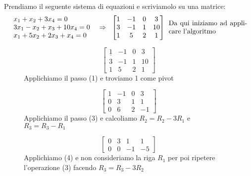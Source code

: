 \newpage
\begin{example}
Prendiamo il seguente sistema di equazioni e scriviamolo su una matrice:
\[
\begin{array}{l}
x_1 + x_2 + 3x_4 = 0\\
3x_1 - x_2 + x_3 + 10x_4 = 0\\
x_1 + 5x_2 + 2x_3 + x_4 = 0
\end{array}
\hspace{.2cm}
\Rightarrow
\hspace{.2cm}
\begin{bmatrix}
1 & -1 & 0 & 3\\
3 & -1 & 1 & 10\\
1 & 5 & 2 & 1
\end{bmatrix}
\:\:
\parbox{4cm}{Da qui iniziamo ad applicare l'algoritmo}
\]
\end{example}
\begin{figure}[h!]
    \vspace{-20pt}
    \centering
    \begin{minipage}{.3\linewidth}
        \centering
        \[
            \begin{bmatrix}
            \underline{1} & -1 & 0 & 3\\
            3 & -1 & 1 & 10\\
            1 & 5 & 2 & 1
            \end{bmatrix}
        \]
        Applichiamo il passo (1) e troviamo 1 come pivot
    \end{minipage}
    \begin{minipage}{.3\linewidth}
        \centering
        \[
            \begin{bmatrix}
            1 & -1 & 0 & 3\\
            0 & 3 & 1 & 1\\
            0 & 6 & 2 & -1
            \end{bmatrix}
        \]
        Applichiamo il passo (3) e calcoliamo $R_2 = R_2 - 3R_1$ e $R_3 = R_3 - R_1$
    \end{minipage}
    \begin{minipage}{.3\linewidth}
        \centering
        \[
            \begin{bmatrix}
            0 & 3 & 1 & 1\\
            0 & 0 & -1 & -5
            \end{bmatrix}
        \]
        Applichiamo (4) e non consideriamo la riga $R_1$ per poi ripetere l'operazione (3) facendo $R_3 = R_3 - 3R_2$
    \end{minipage}
\end{figure}
